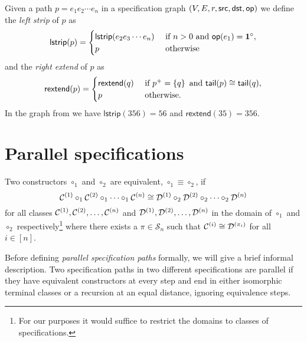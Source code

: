 Given a path $p = e_1e_2\dotsm e_n$ in a specification graph $(V,E,r,\textsf{src},\textsf{dst},\textsf{op})$ we define the \emph{left strip} of $p$ as
\[
     \textsf{lstrip}(p) = \begin{cases} \textsf{lstrip}(e_2e_3\dotsm e_n) & \text{ if } n > 0 \text{ and } \textsf{op}(e_1) = \mathbf{1}^\circ,\\
     p & \text{ otherwise}
     \end{cases}
\]
and the \emph{right extend} of $p$ as
\[
    \textsf{rextend}(p) = \begin{cases}
        \textsf{rextend}(q) & \text{ if } p^+ = \left\{q\right\} \text{ and } \textsf{tail}(p) \cong \textsf{tail}(q),\\
        p & \text{ otherwise}.
    \end{cases}
\]
In the graph from  we have $\textsf{lstrip}(356) = 56$ and $\textsf{rextend}(35) = 356$.

\section{Parallel specifications}
\begin{definition}
Two constructors $\circ_1$ and $\circ_2$ are equivalent, $\circ_1 \equiv \circ_2$, if
\[
    \mathcal{C}^{\left(1\right)} \circ_1 \mathcal{C}^{\left(2\right)} \circ_1 \dotsm \circ_1 \mathcal{C}^{\left(n\right)} \cong \mathcal{D}^{\left(1\right)} \circ_2 \mathcal{D}^{\left(2\right)} \circ_2 \dotsm \circ_2 \mathcal{D}^{\left(n\right)}
\]
for all classes $\mathcal{C}^{\left(1\right)},\mathcal{C}^{\left(2\right)},\dotsc,\mathcal{C}^{\left(n\right)}$ and $\mathcal{D}^{\left(1\right)},\mathcal{D}^{\left(2\right)},\dotsc,\mathcal{D}^{\left(n\right)}$ in the domain of $\circ_1$ and $\circ_2$ respectively\footnote{For our purposes it would suffice to restrict the domains to classes of specifications.} where there exists a $\pi\in\mathcal{S}_n$ such that $\mathcal{C}^{\left(i\right)}\cong\mathcal{D}^{\left(\pi_i\right)}$ for all $i\in[n]$.
\end{definition}

Before defining \emph{parallel specification paths} formally, we will give a brief informal description. Two specification paths in two different specifications are parallel if they have equivalent constructors at every step and end in either isomorphic terminal classes or a recursion at an equal distance, ignoring equivalence steps.

